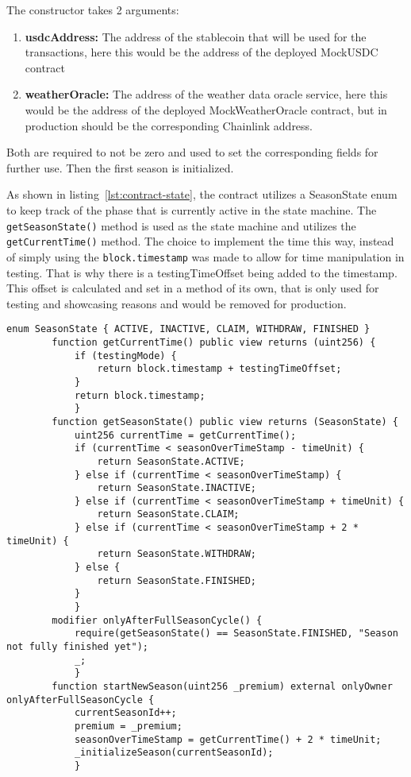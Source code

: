 \documentclass[11pt,a4paper]{article}
\begin{document}
		The constructor takes 2 arguments:
		\begin{enumerate}[(1)]
			\item \textbf{usdcAddress:} The address of the stablecoin that will be used for the transactions, here this would be the address of the deployed MockUSDC contract
			\item \textbf{weatherOracle:} The address of the weather data oracle service, here this would be the address of the deployed MockWeatherOracle contract, but in production should be the corresponding Chainlink address.
		\end{enumerate}

		Both are required to not be zero and used to set the corresponding fields for further use.
		Then the first season is initialized.

        \bigskip

		As shown in listing~\ref{lst:contract-state}, the contract utilizes a SeasonState enum to keep track of the phase that is currently active in the state machine.
		The \texttt{getSeasonState()} method is used as the state machine and utilizes the \texttt{getCurrentTime()} method.
		The choice to implement the time this way, instead of simply using the \texttt{block.timestamp} was made to allow for time manipulation in testing.
		That is why there is a testingTimeOffset being added to the timestamp.
		This offset is calculated and set in a method of its own, that is only used for testing and showcasing reasons and would be removed for production.

		\begin{lstlisting}[style=soliditystyle, caption={Excerpt: RainyDayFund.sol - StateMachine},label={lst:contract-state}]
		enum SeasonState { ACTIVE, INACTIVE, CLAIM, WITHDRAW, FINISHED }
		function getCurrentTime() public view returns (uint256) {
			if (testingMode) {
				return block.timestamp + testingTimeOffset;
			}
			return block.timestamp;
			}
        function getSeasonState() public view returns (SeasonState) {
            uint256 currentTime = getCurrentTime();
            if (currentTime < seasonOverTimeStamp - timeUnit) {
                return SeasonState.ACTIVE;
            } else if (currentTime < seasonOverTimeStamp) {
                return SeasonState.INACTIVE;
            } else if (currentTime < seasonOverTimeStamp + timeUnit) {
                return SeasonState.CLAIM;
            } else if (currentTime < seasonOverTimeStamp + 2 * timeUnit) {
                return SeasonState.WITHDRAW;
            } else {
                return SeasonState.FINISHED;
            }
            }
        modifier onlyAfterFullSeasonCycle() {
            require(getSeasonState() == SeasonState.FINISHED, "Season not fully finished yet");
            _;
            }
        function startNewSeason(uint256 _premium) external onlyOwner onlyAfterFullSeasonCycle {
            currentSeasonId++;
            premium = _premium;
            seasonOverTimeStamp = getCurrentTime() + 2 * timeUnit;
            _initializeSeason(currentSeasonId);
            }
		\end{lstlisting}
\end{document}
